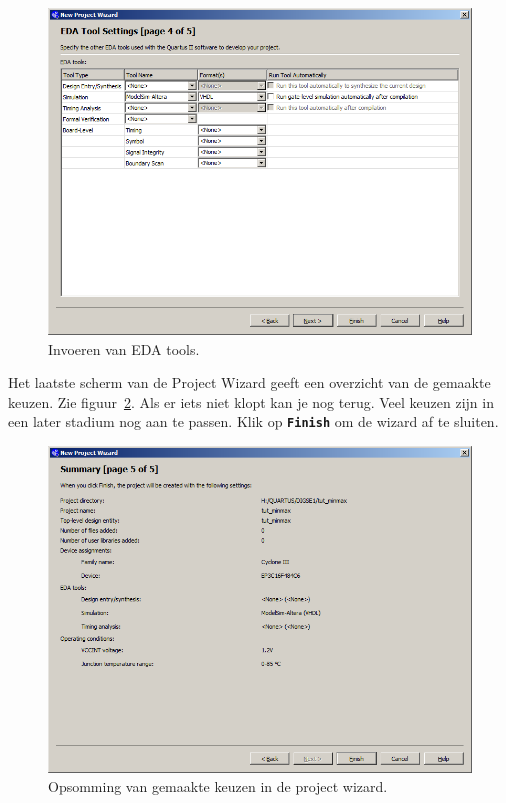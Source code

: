 \documentclass[a4paper,12pt,fleqn,twoside]{book}
\def\tutpicscale{0.455}
\newcommand{\knop}[1]{\texttt{\textbf{#1}}}
\begin{document}
\begin{figure}[H]
\centering
\includegraphics[scale=\tutpicscale]{029edatoolsettings.png}
\caption{Invoeren van EDA tools.}
\label{fig:029edatoolsettings}
\end{figure}

Het laatste scherm van de Project Wizard geeft een overzicht van de gemaakte
keuzen. Zie figuur~\ref{fig:030summary}. Als er iets niet klopt kan je nog
terug. Veel keuzen zijn in een later stadium nog aan te passen. Klik op
\knop{Finish} om de wizard af te sluiten.

\begin{figure}[H]
\centering
\includegraphics[scale=\tutpicscale]{030summary.png}
\caption{Opsomming van gemaakte keuzen in de project wizard.}
\label{fig:030summary}
\end{figure}
\end{document}
